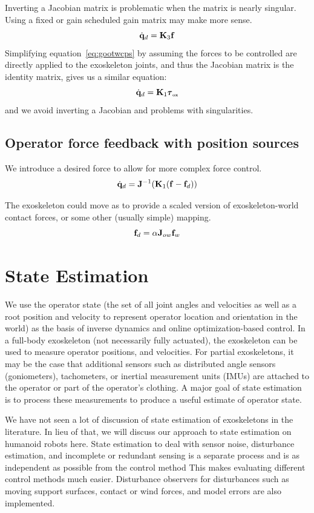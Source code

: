 \documentclass[letterpaper,12pt,fullpage]{article}
\newcommand{\ox}{{\mbox {\tiny ox}}}
\begin{document}
Inverting a Jacobian matrix is problematic when the matrix is
nearly singular.
Using a fixed or gain scheduled gain matrix may make more sense.
\begin{equation}
\dot{{\bf q}}_d = {\bf K}_3 {\bf f}
\end{equation}
Simplifying equation~\ref{eq:gootwcps}
by assuming the forces to be controlled
are directly applied to the exoskeleton joints, and thus the Jacobian matrix
is the identity matrix, gives us a similar equation:
\begin{equation}
\dot{\vq}_d = \mK_1 \vtau_{\ox}
\end{equation}
and we avoid inverting a Jacobian and problems with singularities.

\subsection{Operator force feedback with position sources}

We introduce a desired force to allow for more complex force control.
\begin{equation}
\dot{{\bf q}}_d = {\bf J}^{-1} ({\bf K}_1 ({\bf f} - {\bf f}_d))
\end{equation}

The exoskeleton could move as to provide a scaled version of exoskeleton-world
contact forces, or some other (usually simple) mapping. 
\begin{equation}
{\bf f}_d = \alpha {\bf J}_{ow} {\bf f}_w
\end{equation}

\section{State Estimation}

We use the operator state (the set of all joint angles and velocities
as well as a root position and velocity to represent operator location
and orientation in the world) as the basis of inverse dynamics and
online optimization-based control.
In a full-body exoskeleton
(not necessarily fully actuated), the
exoskeleton can be used to measure operator positions, and velocities.
For partial exoskeletons,
it may be the case that additional sensors such as distributed 
angle sensors (goniometers), tachometers, or inertial measurement units (IMUs)
are attached to the operator or part of the operator's clothing.
A major goal of state estimation is to process these measurements to
produce a useful estimate of operator state.

We have not seen a lot of discussion of state estimation of exoskeletons in
the literature.
In lieu of that,
we will discuss our approach to state estimation on humanoid robots here.
State estimation to deal with sensor noise,
disturbance estimation, and incomplete or
redundant sensing is a separate process and is as independent as possible
from the control method
This makes evaluating different control methods much easier.
Disturbance observers for disturbances such as
moving support surfaces, contact or wind forces, and model errors
are also implemented.
\end{document}
